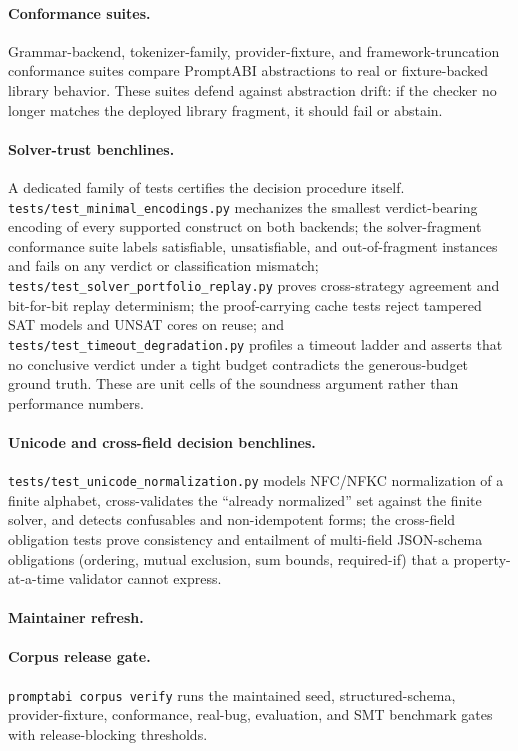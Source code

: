 \documentclass[10pt]{article}
\begin{document}
\paragraph{Conformance suites.}
Grammar-backend, tokenizer-family, provider-fixture, and framework-truncation
conformance suites compare PromptABI abstractions to real or fixture-backed
library behavior. These suites defend against abstraction drift: if the checker
no longer matches the deployed library fragment, it should fail or abstain.

\paragraph{Solver-trust benchlines.}
A dedicated family of tests certifies the decision procedure itself.
\texttt{tests/test\_minimal\_encodings.py} mechanizes the smallest verdict-bearing
encoding of every supported construct on both backends; the
solver-fragment conformance suite labels satisfiable, unsatisfiable, and
out-of-fragment instances and fails on any verdict or classification mismatch;
\texttt{tests/test\_solver\_portfolio\_replay.py} proves cross-strategy agreement
and bit-for-bit replay determinism; the proof-carrying cache tests reject
tampered SAT models and UNSAT cores on reuse; and
\texttt{tests/test\_timeout\_degradation.py} profiles a timeout ladder and asserts
that no conclusive verdict under a tight budget contradicts the generous-budget
ground truth. These are unit cells of the soundness argument rather than
performance numbers.

\paragraph{Unicode and cross-field decision benchlines.}
\texttt{tests/test\_unicode\_normalization.py} models NFC/NFKC normalization of a
finite alphabet, cross-validates the ``already normalized'' set against the
finite solver, and detects confusables and non-idempotent forms; the cross-field
obligation tests prove consistency and entailment of multi-field JSON-schema
obligations (ordering, mutual exclusion, sum bounds, required-if) that a
property-at-a-time validator cannot express.


\paragraph{Maintainer refresh.}
\paragraph{Corpus release gate.}
\texttt{promptabi corpus verify} runs the maintained seed, structured-schema,
provider-fixture, conformance, real-bug, evaluation, and SMT benchmark gates
with release-blocking thresholds.
\end{document}
